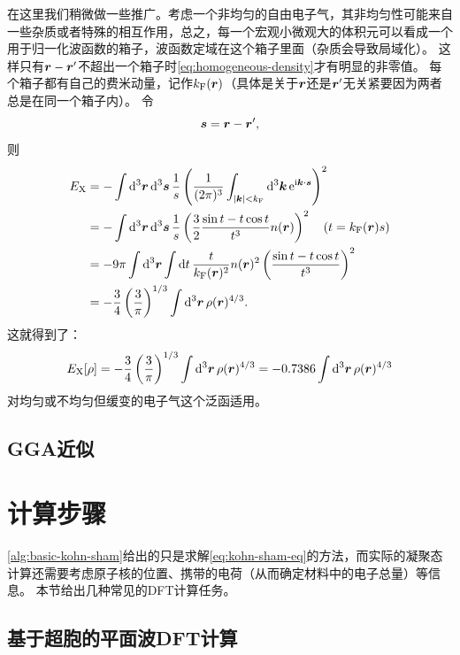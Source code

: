 在这里我们稍微做一些推广。考虑一个非均匀的自由电子气，其非均匀性可能来自一些杂质或者特殊的相互作用，总之，每一个宏观小微观大的体积元可以看成一个用于归一化波函数的箱子，波函数定域在这个箱子里面（杂质会导致局域化）。
这样只有$\vb*{r} - \vb*{r}'$不超出一个箱子时\eqref{eq:homogeneous-density}才有明显的非零值。
每个箱子都有自己的费米动量，记作$k_\text{F}(\vb*{r})$（具体是关于$\vb*{r}$还是$\vb*{r}'$无关紧要因为两者总是在同一个箱子内）。
令
\[
    \vb*{s} = \vb*{r} - \vb*{r}', 
\]
则
\[
    \begin{aligned}
        E_\text{X} &= - \int \dd[3]{\vb*{r}} \dd[3]{\vb*{s}} \frac{1}{s} \left( \frac{1}{(2\pi)^3} \int_{\abs{\vb*{k}} < k_\text{F}} \dd[3]{\vb*{k}} \mathrm{e}^{\mathrm{i} \vb*{k} \cdot \vb*{s}} \right)^2 \\
        &= - \int \dd[3]{\vb*{r}} \dd[3]{\vb*{s}} \frac{1}{s} \left( \frac{3}{2} \frac{\sin t - t \cos t}{t^3} n(\vb*{r}) \right)^2 \quad (t= k_\text{F}(\vb*{r}) s) \\
        &= - 9 \pi \int \dd[3]{\vb*{r}} \int \dd{t} \frac{t}{k_\text{F}(\vb*{r})^2} n(\vb*{r})^2 \left( \frac{\sin t - t \cos t}{t^3} \right)^2 \\
        &= - \frac{3}{4} \left( \frac{3}{\pi} \right)^{1/3} \int \dd[3]{\vb*{r}} \rho(\vb*{r})^{4/3}.
    \end{aligned}
\]
这就得到了：
\begin{equation}
    E_\text{X}[\rho] = - \frac{3}{4} \left( \frac{3}{\pi} \right)^{1/3} \int \dd[3]{\vb*{r}} \rho(\vb*{r})^{4/3} = - 0.7386 \int \dd[3]{\vb*{r}} \rho(\vb*{r})^{4/3}
\end{equation}
对均匀或不均匀但缓变的电子气这个泛函适用。

\subsection{GGA近似}

\section{计算步骤}

\autoref{alg:basic-kohn-sham}给出的只是求解\eqref{eq:kohn-sham-eq}的方法，而实际的凝聚态计算还需要考虑原子核的位置、携带的电荷（从而确定材料中的电子总量）等信息。
本节给出几种常见的DFT计算任务。

\subsection{基于超胞的平面波DFT计算}

